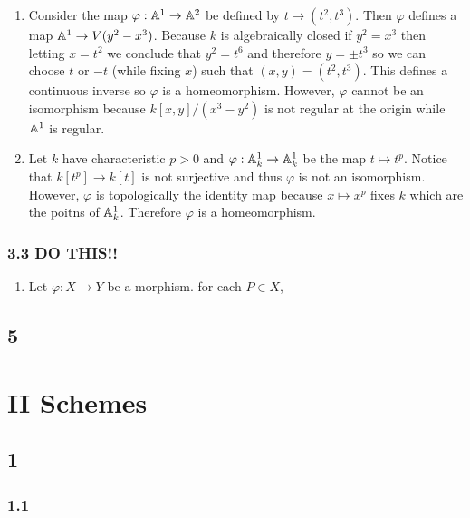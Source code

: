 \documentclass[12pt]{article}
\begin{document}
\begin{enumerate}
\item Consider the map $\varphi : \mathbb{A}^1 \to \mathbb{A}^2$ be defined by $t \mapsto (t^2, t^3)$. Then $\varphi$ defines a map $\mathbb{A}^1 \to V(y^2 - x^3)$. Because $k$ is algebraically closed if $y^2 = x^3$ then letting $x = t^2$ we conclude that $y^2 = t^6$ and therefore $y = \pm t^3$ so we can choose $t$ or $-t$ (while fixing $x$) such that $(x,y) = (t^2, t^3)$. This defines a continuous inverse so $\varphi$ is a homeomorphism. However, $\varphi$ cannot be an isomorphism because $k[x,y]/(x^3 - y^2)$ is not regular at the origin while $\mathbb{A}^1$ is regular.
\item Let $k$ have characteristic $p > 0$ and $\varphi : \mathbb{A}^1_k \to \mathbb{A}^1_k$ be the map $t \mapsto t^p$. Notice that $k[t^p] \to k[t]$ is not surjective and thus $\varphi$ is not an isomorphism. However, $\varphi$ is topologically the identity map because $x \mapsto x^p$ fixes $k$ which are the poitns of $\mathbb{A}^1_k$. Therefore $\varphi$ is a homeomorphism. 
\end{enumerate}

\subsubsection{3.3 DO THIS!!}

\begin{enumerate}
\item Let $\varphi : X \to Y$ be a morphism. for each $P \in X$, 
\end{enumerate}

\subsection{5}

\section{II Schemes}

\subsection{1}

\subsubsection{1.1}
\end{document}
